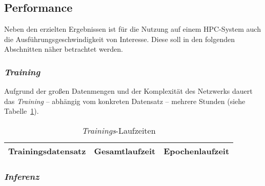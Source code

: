 \subsection{Performance}

Neben den erzielten Ergebnissen ist für die Nutzung auf einem HPC-System auch die Ausführungsgeschwindigkeit von
Interesse. Diese soll in den folgenden Abschnitten näher betrachtet werden.

\subsubsection{\textit{Training}}
\label{ergebnisse:performance:training}

Aufgrund der großen Datenmengen und der Komplexität des Netzwerks dauert das \textit{Training} -- abhängig vom konkreten
Datensatz -- mehrere Stunden (siehe Tabelle~\ref{ergebnisse:performance:training:laufzeit}).

\begin{table}
    \caption{\textit{Trainings}-Laufzeiten}
    \centering
    \begin{tabular}{|c|c|c|}
        \hline
        \textbf{Trainingsdatensatz} & \textbf{Gesamtlaufzeit} & \textbf{Epochenlaufzeit} \\ \hline \hline
    \end{tabular}
    \label{ergebnisse:performance:training:laufzeit}
\end{table}

\subsubsection{\textit{Inferenz}}
